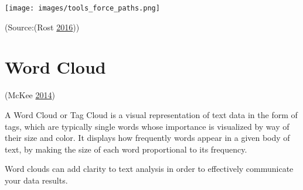 \documentclass[]{book}
\begin{document}
\texttt{[image: images/tools\_force\_paths.png]}

(Source:(Rost \protect\hyperlink{ref-different_tools}{2016}))

\hypertarget{word-cloud}{%
\section{Word Cloud}\label{word-cloud}}

(McKee \protect\hyperlink{ref-wordcloud}{2014})

A Word Cloud or Tag Cloud is a visual representation of text data in the form of tags, which are typically single words whose importance is visualized by way of their size and color. It displays how frequently words appear in a given body of text, by making the size of each word proportional to its frequency.

Word clouds can add clarity to text analysis in order to effectively communicate your data results.
\end{document}
